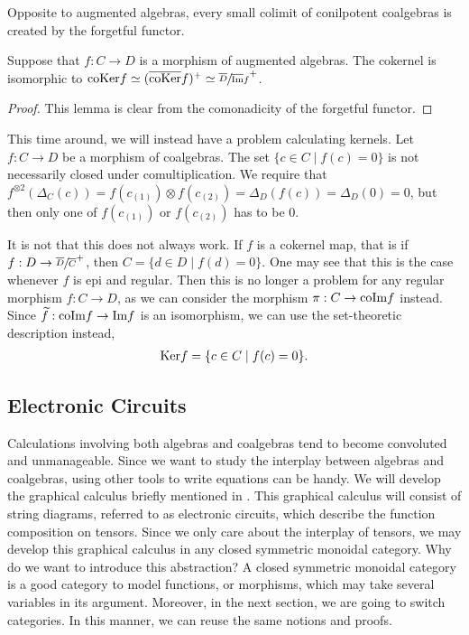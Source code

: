\documentclass[../thesis.tex]{subfiles}
\begin{document}
                Opposite to augmented algebras, every small colimit of conilpotent coalgebras is created by the forgetful functor.

                \begin{lemma}
                    Suppose that $f: C \rightarrow D$ is a morphism of augmented algebras. The cokernel is isomorphic to $\tt{coKer}f \simeq (\overline{\tt{coKer}}f)^+ \simeq \sfrac{\overline{D}}{\overline{\tt{Im}}f}^+$.
                \end{lemma}

                \begin{proof}
                    This lemma is clear from the comonadicity of the forgetful functor.
                \end{proof}

                This time around, we will instead have a problem calculating kernels. Let $f: C \rightarrow D$ be a morphism of coalgebras. The set $\{c\in C \mid f(c) = 0\}$ is not necessarily closed under comultiplication. We require that $f^{\otimes 2}(\Delta_C(c)) = f(c_{(1)})\otimes f(c_{(2)}) = \Delta_D(f(c)) = \Delta_D(0) = 0$, but then only one of $f(c_{(1)})$ or $f(c_{(2)})$ has to be $0$.

                It is not that this does not always work. If $f$ is a cokernel map, that is if $f : D \rightarrow \sfrac{\overline{D}}{\overline{C}}^+$, then $C = \{d\in D \mid f(d) = 0\}$. One may see that this is the case whenever $f$ is epi and regular. Then this is no longer a problem for any regular morphism $f: C \rightarrow D$, as we can consider the morphism $\pi: C \rightarrow \tt{coIm}f$ instead. Since $\widetilde{f}: \tt{coIm}f \rightarrow \tt{Im}f$ is an isomorphism, we can use the set-theoretic description instead,
                \begin{align*}
                    \tt{Ker}f = \{c\in C \mid f(c) = 0\}\tt{.}
                \end{align*}

    \subsection{Electronic Circuits}
            Calculations involving both algebras and coalgebras tend to become convoluted and unmanageable. Since we want to study the interplay between algebras and coalgebras, using other tools to write equations can be handy. We will develop the graphical calculus briefly mentioned in \cite{Loday12}. This graphical calculus will consist of string diagrams, referred to as electronic circuits, which describe the function composition on tensors. Since we only care about the interplay of tensors, we may develop this graphical calculus in any closed symmetric monoidal category. Why do we want to introduce this abstraction? A closed symmetric monoidal category is a good category to model functions, or morphisms, which may take several variables in its argument. Moreover, in the next section, we are going to switch categories. In this manner, we can reuse the same notions and proofs.
            
\end{document}

